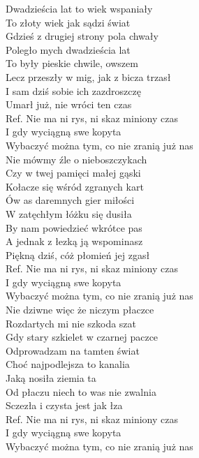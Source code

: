 
\begin{flushleft}
Dwadzieścia lat to wiek wspaniały \\
To złoty wiek jak sądzi świat \tab{}\\
Gdzieś z drugiej strony pola chwały \\
Poległo mych dwadzieścia lat \tab{}\\
To były pieskie chwile, owszem \\
Lecz przeszły w mig, jak z bicza trzasł \\
I sam dziś sobie ich zazdroszczę \\
Umarł już, nie wróci ten czas \tab{}\\
\vskip 3mm
Ref. Nie ma ni rys, ni skaz miniony czas \tab{}\\
\hspace{0.9cm}I gdy wyciągną swe kopyta \tab{}\\
\hspace{0.9cm}Wybaczyć można tym, co nie zranią już nas \\
\vskip 3mm
Nie mówmy źle o nieboszczykach \\
Czy w twej pamięci małej gąski \\
Kołacze się wśród zgranych kart \\
Ów as daremnych gier miłości \\
W zatęchłym łóżku się dusiła \\
By nam powiedzieć wkrótce pas \\
A jednak z łezką ją wspominasz \\
Piękną dziś, cóż płomień jej zgasł \\
\vskip 3mm
Ref. Nie ma ni rys, ni skaz miniony czas\\
\hspace{0.9cm}I gdy wyciągną swe kopyta \\
\hspace{0.9cm}Wybaczyć można tym, co nie zranią już nas\\
\vskip 3mm
Nie dziwne więc że niczym płaczce \\
Rozdartych mi nie szkoda szat \\
Gdy stary szkielet w czarnej paczce \\
Odprowadzam na tamten świat \\
Choć najpodlejsza to kanalia \\
Jaką nosiła ziemia ta \\
Od płaczu niech to was nie zwalnia \\
Sczezła i czysta jest jak łza \\
\vskip 3mm
Ref. Nie ma ni rys, ni skaz miniony czas\\
\hspace{0.9cm}I gdy wyciągną swe kopyta \\
\hspace{0.9cm}Wybaczyć można tym, co nie zranią już nas \\
\end{flushleft}
\clearpage
